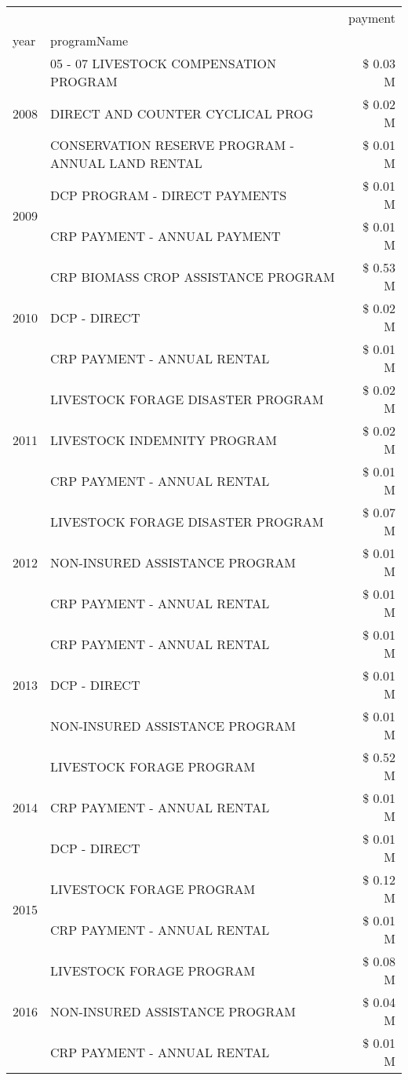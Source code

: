 \begin{tabular}{llr}
\toprule
 &  & payment \\
year & programName &  \\
\midrule
\multirow[t]{3}{*}{2008} & 05 - 07 LIVESTOCK COMPENSATION PROGRAM & \$ 0.03 M \\
 & DIRECT AND COUNTER CYCLICAL PROG & \$ 0.02 M \\
 & CONSERVATION RESERVE PROGRAM - ANNUAL LAND RENTAL & \$ 0.01 M \\
\cline{1-3}
\multirow[t]{2}{*}{2009} & DCP PROGRAM - DIRECT PAYMENTS & \$ 0.01 M \\
 & CRP PAYMENT - ANNUAL PAYMENT & \$ 0.01 M \\
\cline{1-3}
\multirow[t]{3}{*}{2010} & CRP BIOMASS CROP ASSISTANCE PROGRAM & \$ 0.53 M \\
 & DCP - DIRECT & \$ 0.02 M \\
 & CRP PAYMENT - ANNUAL RENTAL & \$ 0.01 M \\
\cline{1-3}
\multirow[t]{3}{*}{2011} & LIVESTOCK FORAGE DISASTER PROGRAM & \$ 0.02 M \\
 & LIVESTOCK INDEMNITY PROGRAM & \$ 0.02 M \\
 & CRP PAYMENT - ANNUAL RENTAL & \$ 0.01 M \\
\cline{1-3}
\multirow[t]{3}{*}{2012} & LIVESTOCK FORAGE DISASTER PROGRAM & \$ 0.07 M \\
 & NON-INSURED ASSISTANCE PROGRAM & \$ 0.01 M \\
 & CRP PAYMENT - ANNUAL RENTAL & \$ 0.01 M \\
\cline{1-3}
\multirow[t]{3}{*}{2013} & CRP PAYMENT - ANNUAL RENTAL & \$ 0.01 M \\
 & DCP - DIRECT & \$ 0.01 M \\
 & NON-INSURED ASSISTANCE PROGRAM & \$ 0.01 M \\
\cline{1-3}
\multirow[t]{3}{*}{2014} & LIVESTOCK FORAGE PROGRAM & \$ 0.52 M \\
 & CRP PAYMENT - ANNUAL RENTAL & \$ 0.01 M \\
 & DCP - DIRECT & \$ 0.01 M \\
\cline{1-3}
\multirow[t]{2}{*}{2015} & LIVESTOCK FORAGE PROGRAM & \$ 0.12 M \\
 & CRP PAYMENT - ANNUAL RENTAL & \$ 0.01 M \\
\cline{1-3}
\multirow[t]{3}{*}{2016} & LIVESTOCK FORAGE PROGRAM & \$ 0.08 M \\
 & NON-INSURED ASSISTANCE PROGRAM & \$ 0.04 M \\
 & CRP PAYMENT - ANNUAL RENTAL & \$ 0.01 M \\

\end{tabular}
